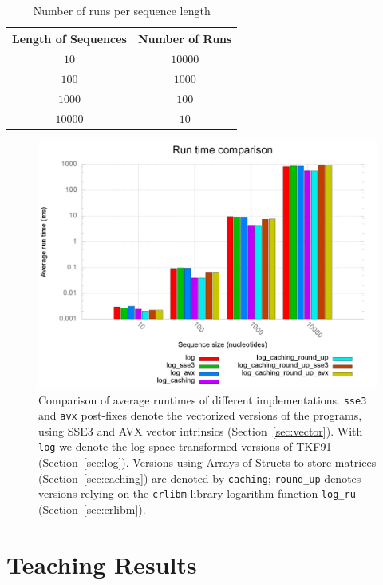 \documentclass[runningheads,a4paper]{llncs}
\begin{document}
\begin{table}
\centering

\begin{tabular}{|c|c|}
\hline 
Length of Sequences & Number of Runs \\ 
\hline 
$10$ & $10000$ \\ 
\hline 
$100$ & $1000$ \\ 
\hline 
$1000$ & $100$ \\ 
\hline 
$10000$ & $10$ \\ 
\hline 
\end{tabular}
\caption{Number of runs per sequence length}
\label{fig:runs}
\end{table}

\begin{figure}[h!]
\includegraphics[width=\textwidth]{images/benchplot.png}
    \caption{Comparison of average runtimes of different implementations. \texttt{sse3} and \texttt{avx} post-fixes denote the vectorized versions of the programs, 
using SSE3 and AVX vector intrinsics (Section~\ref{sec:vector}). With \texttt{log} we denote the log-space transformed versions of TKF91 (Section~\ref{sec:log}). 
Versions using Arrays-of-Structs to store matrices (Section~\ref{sec:caching}) are denoted by \texttt{caching}; \texttt{round\_up} denotes versions relying on the \texttt{crlibm} 
library logarithm function \texttt{log\_ru} (Section~\ref{sec:crlibm}).}
\label{fig:runtime}
\end{figure}

\section{Teaching Results} 
\label{teaching-results} 
\end{document}
